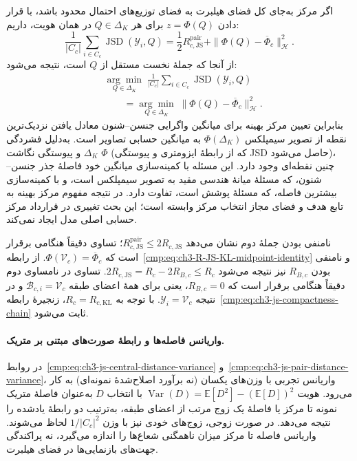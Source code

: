 اگر مرکز به‌جای کل فضای هیلبرت به فضای توزیع‌های
احتمال محدود باشد، با قرار دادن $z=\Phi(Q)$ برای
هر $Q\in\Delta_K$ در همان هویت، داریم:
\[
\frac1{|C_c|}\sum_{i\in C_c}\operatorname{JSD}(\mathscr Y_i,Q)
=\frac12 R_{c,\mathrm{JS}}^{\mathrm{pair}}
+\|\Phi(Q)-\overline{\Phi}_c\|_{\mathcal H}^{2}.
\]
از آنجا که جملهٔ نخست مستقل از $Q$ است، نتیجه می‌شود:
\begin{equation}\label{cmp:eq:ch3-js-optimal-center-projection}
\boxed{\begin{aligned}
&\underset{Q\in\Delta_K}{\arg\min}\;
\frac1{|C_c|}\sum_{i\in C_c}\operatorname{JSD}(\mathscr Y_i,Q)\\
&\qquad=\underset{Q\in\Delta_K}{\arg\min}\;
\|\Phi(Q)-\overline{\Phi}_c\|_{\mathcal H}^{2}.
\end{aligned}}
\end{equation}
بنابراین تعیین مرکز بهینه برای میانگین واگرایی
جنسن--شنون معادل یافتن نزدیک‌ترین نقطه از تصویر
سیمپلکس $\Phi(\Delta_K)$ به میانگین حسابی تصاویر
است. به‌دلیل فشردگی $\Delta_K$ و پیوستگی نگاشت
$\Phi$ (که از رابطهٔ ایزومتری و پیوستگی JSD حاصل
می‌شود)، چنین نقطه‌ای وجود دارد. این مسئله با
کمینه‌سازی میانگین خود فاصلهٔ جذر جنسن--شنون، که
مسئلهٔ میانهٔ هندسی مقید به تصویر سیمپلکس است، و
با کمینه‌سازی بیشترین فاصله، که مسئلهٔ پوشش است،
تفاوت دارد. در نتیجه مفهوم مرکز بهینه به تابع هدف
و فضای مجاز انتخاب مرکز وابسته است؛ این بحث تغییری
در قرارداد مرکز حسابی اصلی مدل ایجاد نمی‌کند.

نامنفی بودن جملهٔ دوم نشان می‌دهد
$R_{c,\mathrm{JS}}^{\mathrm{pair}}\le 2R_{c,\mathrm{JS}}$؛
تساوی دقیقاً هنگامی برقرار است که
$\Phi(\mathcal V_c)=\overline{\Phi}_c$.
از رابطه~\eqref{cmp:eq:ch3-R-JS-KL-midpoint-identity}
و نامنفی بودن $R_{B,c}$ نیز نتیجه می‌شود
$2R_{c,\mathrm{JS}}=R_c-2R_{B,c}\le R_c$.
تساوی در نامساوی دوم دقیقاً هنگامی برقرار است که
$R_{B,c}=0$، یعنی برای همهٔ اعضای طبقه
$\mathscr B_{c,i}=\mathcal V_c$ و در نتیجه
$\mathscr Y_i=\mathcal V_c$.
با توجه به $R_c=R_{c,\mathrm{KL}}$،
زنجیرهٔ رابطه~\eqref{cmp:eq:ch3-js-compactness-chain}
ثابت می‌شود.

\paragraph{واریانس فاصله‌ها و رابطهٔ صورت‌های مبتنی بر متریک.}
در روابط~\eqref{cmp:eq:ch3-js-central-distance-variance}
و~\eqref{cmp:eq:ch3-js-pair-distance-variance}، واریانس
تجربی با وزن‌های یکسان (نه برآورد اصلاح‌شدهٔ نمونه‌ای)
به کار می‌رود. هویت $\operatorname{Var}(D)=
\mathbb E[D^2]-(\mathbb E[D])^2$ با انتخاب $D$ به‌عنوان
فاصلهٔ متریک نمونه تا مرکز یا فاصلهٔ یک زوج مرتب
از اعضای طبقه، به‌ترتیب دو رابطهٔ یادشده را نتیجه
می‌دهد. در صورت زوجی، زوج‌های خودی نیز با وزن
$1/|C_c|^2$ لحاظ می‌شوند. واریانس فاصله تا مرکز
میزان ناهمگنی شعاع‌ها را اندازه می‌گیرد، نه پراکندگی
جهت‌های بازنمایی‌ها در فضای هیلبرت.

